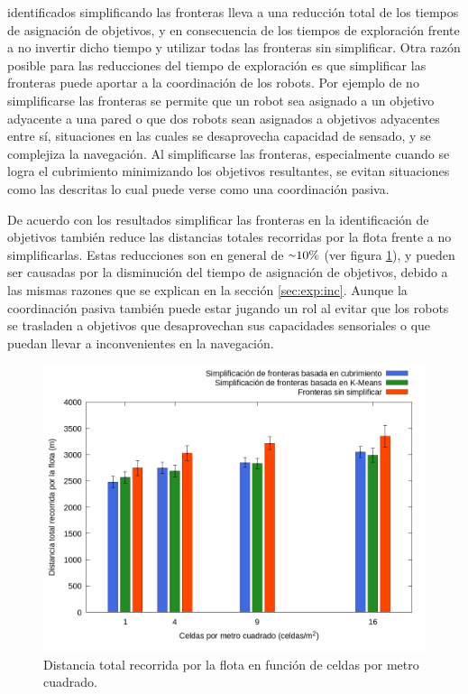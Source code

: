 identificados simplificando las fronteras lleva a una reducción total de los
tiempos de asignación de objetivos, y en consecuencia de los tiempos de exploración
frente a no invertir dicho tiempo y utilizar todas las fronteras sin
simplificar. Otra razón posible para las reducciones del tiempo de exploración
es que simplificar las fronteras puede aportar a la coordinación de los robots.
Por ejemplo de no simplificarse las fronteras se permite que un robot sea
asignado a un objetivo adyacente a una pared o que dos robots sean asignados a
objetivos adyacentes entre sí, situaciones en las cuales se desaprovecha
capacidad de sensado, y se complejiza la navegación. Al simplificarse las
fronteras, especialmente cuando se logra el cubrimiento minimizando los
objetivos resultantes, se evitan situaciones como las descritas lo cual puede
verse como una coordinación pasiva. %

De acuerdo con los resultados simplificar las fronteras en la identificación de
objetivos también reduce las distancias totales recorridas por la flota frente
a no simplificarlas. Estas reducciones son en general de ${\smallsim}10\%$ (ver figura \ref{fig:gra:idobj:ec}), y
pueden ser causadas por la disminución del tiempo de asignación de objetivos,
debido a las mismas razones que se explican en la sección \ref{sec:exp:inc}.
Aunque la coordinación pasiva también puede estar jugando un rol al evitar que
los robots se trasladen a objetivos que desaprovechan sus capacidades
sensoriales o que puedan llevar a inconvenientes en la navegación.

\begin{figure}[H]
  \centerfloat
  \includegraphics[clip=true, width=\graphlen]{imagenes/graficas_chicas/graficas_histo_num/ident_obj/exploration_cost.png}
  \caption{Distancia total recorrida por la flota en función de celdas por metro cuadrado.}\label{fig:gra:idobj:ec}
\end{figure}

